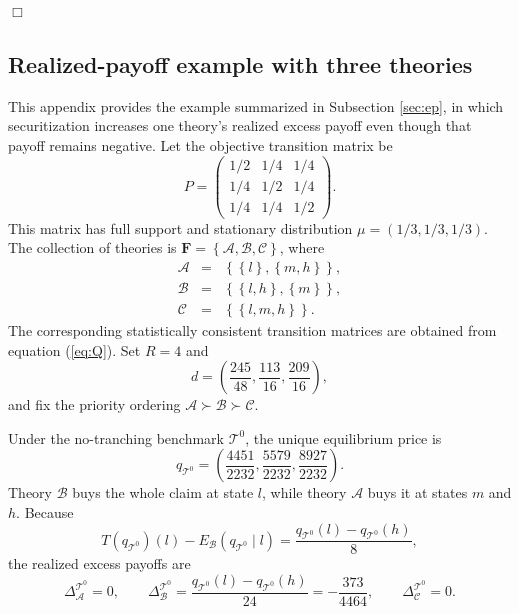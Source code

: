 \documentclass[11pt]{article}
\theoremstyle{plain}
\begin{document}
\hfill $\Box$

\subsection{Realized-payoff example with three theories}\label{app:return-example}

This appendix provides the example summarized in Subsection \ref{sec:ep}, in which securitization increases one theory's realized excess payoff even though that payoff remains negative. Let the objective transition matrix be
\[
P=
\begin{pmatrix}
1/2&1/4&1/4\\
1/4&1/2&1/4\\
1/4&1/4&1/2
\end{pmatrix}.
\]
This matrix has full support and stationary distribution $\mu=(1/3,1/3,1/3)$. The collection of theories is $\mathbf{F}=\left\{\mathcal{A},\mathcal{B},\mathcal{C}\right\}$, where
\begin{eqnarray*}
\mathcal{A} & = &
\left\{
\left\{l\right\},
\left\{m,h\right\}
\right\},
\\
\mathcal{B} & = &
\left\{
\left\{l,h\right\},
\left\{m\right\}
\right\},
\\
\mathcal{C} & = &
\left\{
\left\{l,m,h\right\}
\right\}.
\end{eqnarray*}
The corresponding statistically consistent transition matrices are obtained from equation (\ref{eq:Q}). Set $R=4$ and
\[
d=\left(\frac{245}{48},\frac{113}{16},\frac{209}{16}\right),
\]
and fix the priority ordering $\mathcal{A}\succ\mathcal{B}\succ\mathcal{C}$.

Under the no-tranching benchmark $\mathcal{T}^0$, the unique equilibrium price is
\[
q_{\mathcal{T}^0}=
\left(
\frac{4451}{2232},
\frac{5579}{2232},
\frac{8927}{2232}
\right).
\]
Theory $\mathcal{B}$ buys the whole claim at state $l$, while theory $\mathcal{A}$ buys it at states $m$ and $h$. Because
\[
T(q_{\mathcal{T}^0})(l)-E_\mathcal{B}(q_{\mathcal{T}^0}\mid l)
=\frac{q_{\mathcal{T}^0}(l)-q_{\mathcal{T}^0}(h)}{8},
\]
the realized excess payoffs are
\[
\Delta_\mathcal{A}^{\mathcal{T}^0}=0,
\qquad
\Delta_\mathcal{B}^{\mathcal{T}^0}
=\frac{q_{\mathcal{T}^0}(l)-q_{\mathcal{T}^0}(h)}{24}
=-\frac{373}{4464},
\qquad
\Delta_\mathcal{C}^{\mathcal{T}^0}=0.
\]
\end{document}
